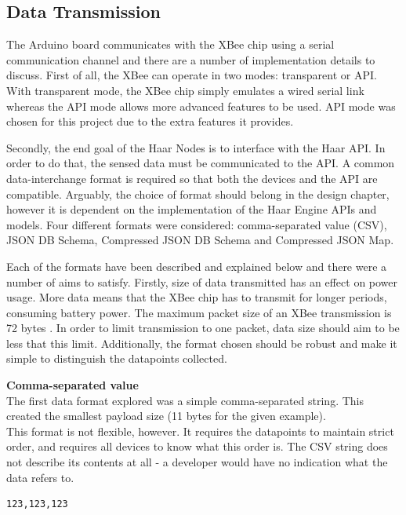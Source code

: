     \subsection{Data Transmission}
      The Arduino board communicates with the XBee chip using a serial communication channel and there are a number of implementation details to discuss. First of all, the XBee can operate in two modes: transparent or API. With transparent mode, the XBee chip simply emulates a wired serial link whereas the API mode allows more advanced features to be used. API mode was chosen for this project due to the extra features it provides.

      Secondly, the end goal of the Haar Nodes is to interface with the Haar API. In order to do that, the sensed data must be communicated to the API. A common data-interchange format is required so that both the devices and the API are compatible. Arguably, the choice of format should belong in the design chapter, however it is dependent on the implementation of the Haar Engine APIs and models. Four different formats were considered: comma-separated value (CSV), JSON DB Schema, Compressed JSON DB Schema and Compressed JSON Map.

      Each of the formats have been described and explained below and there were a number of aims to satisfy. Firstly, size of data transmitted has an effect on power usage. More data means that the XBee chip has to transmit for longer periods, consuming battery power. The maximum packet size of an XBee transmission is 72 bytes \citep{xbee-packet-size}. In order to limit transmission to one packet, data size should aim to be less that this limit. Additionally, the format chosen should be robust and make it simple to distinguish the datapoints collected.\\

      \noindent
      \begin{minipage}[t]{0.45\textwidth}
        \textbf{Comma-separated value}\\
        The first data format explored was a simple comma-separated string. This created the smallest payload size (11 bytes for the given example).\\

        This format is not flexible, however. It requires the datapoints to maintain strict order, and requires all devices to know what this order is. The CSV string does not describe its contents at all - a developer would have no indication what the data refers to.\\
      \end{minipage}
      \hfill
      \begin{minipage}[t]{0.45\textwidth}
        \begin{lstlisting}[frame=single]
  123,123,123
        \end{lstlisting}
      \end{minipage}

